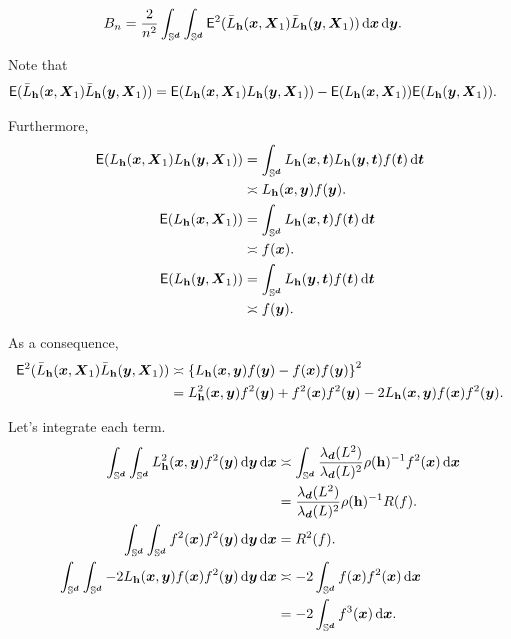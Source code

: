 \documentclass{article}
\begin{document}
\begin{align*}
    B_n &= \frac{2}{n^2} \int_{\Sr} \int_{\Sr} \mathsf{E}^2 ( \bar{L}_{\bh} (\bx,\bX_1) \bar{L}_{\bh} (\by,\bX_1) ) \,\rd \bx \,\rd \by.
\end{align*}

Note that
\begin{align*}
    \mathsf{E} ( \bar{L}_{\bh} (\bx,\bX_1) \bar{L}_{\bh} (\by,\bX_1) ) &= \mathsf{E} ( L_{\bh} (\bx,\bX_1) L_{\bh} (\by,\bX_1) ) - \mathsf{E} (L_{\bh} (\bx,\bX_1)) \mathsf{E} (L_{\bh} (\by,\bX_1)).
\end{align*}

Furthermore,
\begin{align*}
    \mathsf{E} ( L_{\bh} (\bx,\bX_1) L_{\bh} (\by,\bX_1) ) &= \int_{\Sr} L_{\bh} (\bx,\bt) L_{\bh} (\by,\bt) f(\bt) \,\rd \bt \\
    & \asymp L_{\bh} (\bx,\by) f(\by).\\
    \mathsf{E} (L_{\bh} (\bx,\bX_1)) &= \int_{\Sr} L_{\bh} (\bx,\bt) f(\bt) \,\rd \bt \\
    & \asymp f(\bx).\\
    \mathsf{E} (L_{\bh} (\by,\bX_1)) &= \int_{\Sr} L_{\bh} (\by,\bt) f(\bt) \,\rd \bt \\
    & \asymp f(\by).\\
\end{align*}

As a consequence,
\begin{align*}
    \mathsf{E}^2 ( \bar{L}_{\bh} (\bx,\bX_1) \bar{L}_{\bh} (\by,\bX_1) ) & \asymp \lrb{L_{\bh} (\bx,\by) f(\by) - f(\bx)f(\by)}^2 \\
    &= L_{\bh}^2 (\bx,\by) f^2(\by) + f^2(\bx)f^2(\by) -2L_{\bh} (\bx,\by) f(\bx) f^2(\by).
\end{align*}

Let's integrate each term.
\begin{align*}
    \int_{\Sr} \int_{\Sr} L_{\bh}^2 (\bx,\by) f^2(\by) \,\rd \by \,\rd \bx & \asymp \int_{\Sr} \frac{\lambda_{\bd}(L^2)}{\lambda_{\bd}(L)^2} \rho(\bh)^{-1} f^2(\bx) \,\rd \bx \\
    &= \frac{\lambda_{\bd}(L^2)}{\lambda_{\bd}(L)^2} \rho(\bh)^{-1} R(f). \\
    \int_{\Sr} \int_{\Sr} f^2(\bx)f^2(\by) \,\rd \by \,\rd \bx &= R^2(f). \\
    \int_{\Sr} \int_{\Sr}-2L_{\bh} (\bx,\by) f(\bx) f^2(\by) \,\rd \by \,\rd \bx & \asymp -2 \int_{\Sr} f(\bx) f^2(\bx) \,\rd \bx\\
    &= -2 \int_{\Sr}f^3(\bx) \,\rd \bx.
\end{align*}
\end{document}
